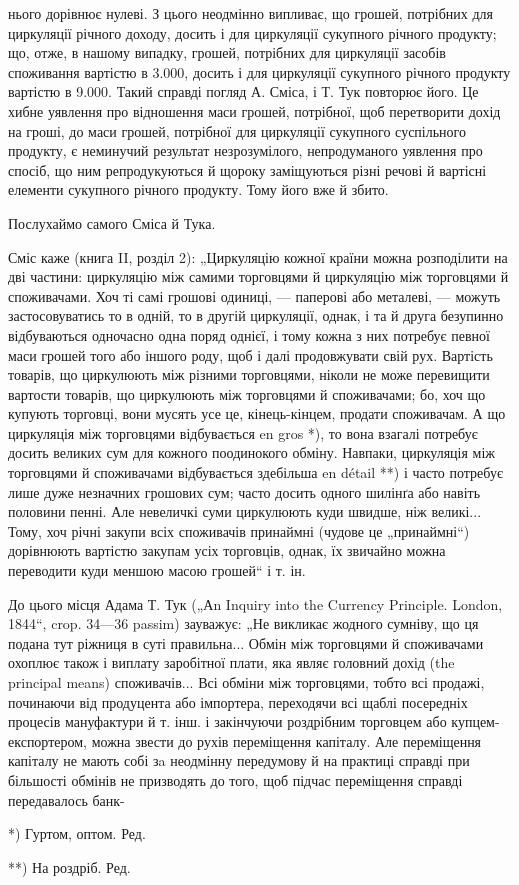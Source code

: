 нього дорівнює нулеві. З цього неодмінно випливає, що грошей, потрібних
для циркуляції річного доходу, досить і для циркуляції сукупного
річного продукту; що, отже, в нашому випадку, грошей, потрібних для
циркуляції засобів споживання вартістю в 3.000, досить і для циркуляції
сукупного річного продукту вартістю в 9.000. Такий справді погляд
А. Сміса, і Т. Тук повторює його. Це хибне уявлення про відношення
маси грошей, потрібної, щоб перетворити дохід на гроші, до маси грошей,
потрібної для циркуляції сукупного суспільного продукту, є неминучий
результат незрозумілого, непродуманого уявлення про спосіб, що
ним репродукуються й щороку заміщуються різні речові й вартісні елементи
сукупного річного продукту. Тому його вже й збито.

Послухаймо самого Сміса й Тука.

Сміс каже (книга II, розділ 2): „Циркуляцію кожної країни можна
розподілити на дві частини: циркуляцію між самими торговцями й циркуляцію
між торговцями й споживачами. Хоч ті самі грошові одиниці, — паперові
або металеві, — можуть застосовуватись то в одній, то в другій
циркуляції, однак, і та й друга безупинно відбуваються одночасно одна поряд
однієї, і тому кожна з них потребує певної маси грошей того або
іншого роду, щоб і далі продовжувати свій рух. Вартість товарів, що циркулюють
між різними торговцями, ніколи не може перевищити вартости
товарів, що циркулюють між торговцями й споживачами; бо, хоч що купують
торговці, вони мусять усе це, кінець-кінцем, продати споживачам.
А що циркуляція між торговцями відбувається en gros *), то вона взагалі потребує
досить великих сум для кожного поодинокого обміну. Навпаки, циркуляція
між торговцями й споживачами відбувається здебільша en détail **)
і часто потребує лише дуже незначних грошових сум; часто досить одного
шилінґа або навіть половини пенні. Але невеличкі суми циркулюють
куди швидше, ніж великі... Тому, хоч річні закупи всіх споживачів принаймні
(чудове це „принаймні“) дорівнюють вартістю закупам усіх
торговців, однак, їх звичайно можна переводити куди меншою масою
грошей“ і т. ін.

До цього місця Адама Т. Тук („Аn Inquiry into the Currency Principle.
London, 1844“, crop. 34—36 passim) зауважує: „Не викликає жодного
сумніву, що ця подана тут ріжниця в суті правильна... Обмін між торговцями
й споживачами охоплює також і виплату заробітної плати, яка
являє головний дохід (the principal means) споживачів... Всі обміни між
торговцями, тобто всі продажі, починаючи від продуцента або імпортера,
переходячи всі щаблі посередніх процесів мануфактури й т. інш. і закінчуючи
роздрібним торговцем або купцем-експортером, можна звести
до рухів переміщення капіталу. Але переміщення капіталу не мають собі
зa неодмінну передумову й на практиці справді при більшості обмінів не
призводять до того, щоб підчас переміщення справді передавалось банк-

*) Гуртом, оптом. Ред.

**) На роздріб. Ред.
